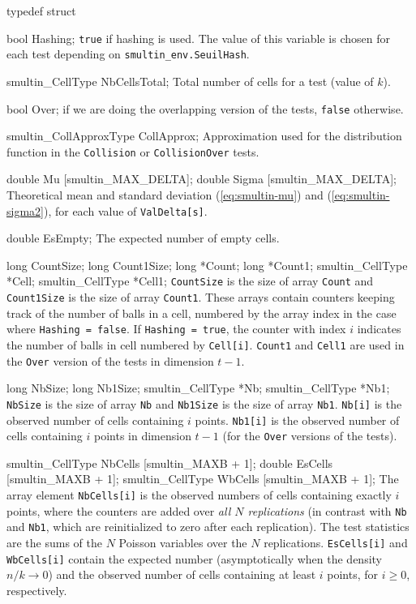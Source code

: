 typedef struct {

   bool Hashing;
\endcode
\tabb
  {\tt true} if hashing is used.
  The value of this variable is chosen for each  test depending on
   {\tt smultin\_env.SeuilHash}.
\endtabb
\code

   smultin_CellType NbCellsTotal;
\endcode
\tabb
   Total number of cells for a test (value of $k$).
 \endtabb
\code

   bool Over;
\endcode
{} if we are doing the overlapping version of the tests,
      {\tt false} otherwise.
\endtabb
\code

   smultin_CollApproxType CollApprox;
\endcode
\tabb Approximation used for the  distribution function in the
    {\tt Collision} or {\tt CollisionOver} tests.
 \endtabb
\code

   double Mu [smultin_MAX_DELTA];
   double Sigma [smultin_MAX_DELTA];
\endcode
\tabb
   Theoretical mean and standard deviation (\ref{eq:smultin-mu}) and
   (\ref{eq:smultin-sigma2}), for each value of {\tt ValDelta[s]}.
\endtabb
\code

   double EsEmpty;
\endcode
\tabb
  The expected number of empty cells.
\endtabb
\code

   long CountSize;
   long Count1Size;
   long *Count;
   long *Count1;
   smultin_CellType *Cell;
   smultin_CellType *Cell1;
\endcode
\tabb
  {\tt CountSize} is the size of array {\tt Count} and
  {\tt Count1Size} is the size of array {\tt Count1}.  These arrays contain
  counters keeping track of the number of balls in a cell, numbered
  by the array index in the case where {\tt Hashing = false}.
  If {\tt Hashing = true}, the counter with index $i$
  indicates the number of balls in cell numbered by  {\tt Cell[i]}.
  {\tt Count1} and  {\tt Cell1} are used in
  the {\tt Over} version of the  tests in dimension $t-1$.
\endtabb
\code

   long NbSize;
   long Nb1Size;
   smultin_CellType *Nb;
   smultin_CellType *Nb1;
\endcode
\tabb
  {\tt NbSize} is the size of array {\tt Nb} and
  {\tt Nb1Size} is the size of array {\tt Nb1}.
  {\tt Nb[i]} is the observed number of cells containing $i$ points.
  {\tt Nb1[i]} is the observed number of cells  containing $i$ points
  in dimension $t-1$ (for the {\tt Over} versions of the tests).
\endtabb
\code

   smultin_CellType NbCells [smultin_MAXB + 1];
   double EsCells [smultin_MAXB + 1];
   smultin_CellType WbCells [smultin_MAXB + 1];
\endcode
\tabb
  The array element {\tt NbCells[i]} is the observed  numbers of
  cells containing exactly $i$ points, where the counters are added over
  {\em all $N$ replications\/} (in contrast with {\tt Nb} and {\tt Nb1},
  which are reinitialized to zero after each replication).
  The test statistics are the sums of the $N$  Poisson variables
  over the $N$ replications.
  {\tt EsCells[i]} and {\tt WbCells[i]} contain the expected number
  (asymptotically when the density $n/k \rightarrow 0$) and the
  observed number of cells containing at least $i$ points, for $i\ge 0$,
  respectively.
\endtabb
\code

}
